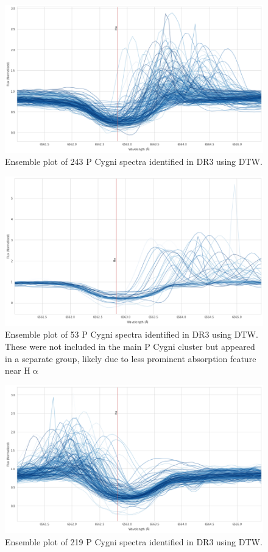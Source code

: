 \begin{figure}[!htb]
\centering
\includegraphics[scale=0.45]{figures/p cygni ensemble.png}
\caption{Ensemble plot of 243 P Cygni spectra identified in DR3 using DTW.}
\end{figure}

\begin{figure}[!htb]
\centering
\includegraphics[scale=0.45]{figures/p cugni 2.png}
\caption{Ensemble plot of 53 P Cygni spectra identified in DR3 using DTW. These were not included in the main P Cygni cluster but appeared in a separate group, likely due to less prominent absorption feature near H$\upalpha$}
\end{figure}

\begin{figure}[!htb]
\centering
\includegraphics[scale=0.45]{figures/inverse p cygni ensemble.png}
\caption{Ensemble plot of 219 P Cygni spectra identified in DR3 using DTW.}
\end{figure}

